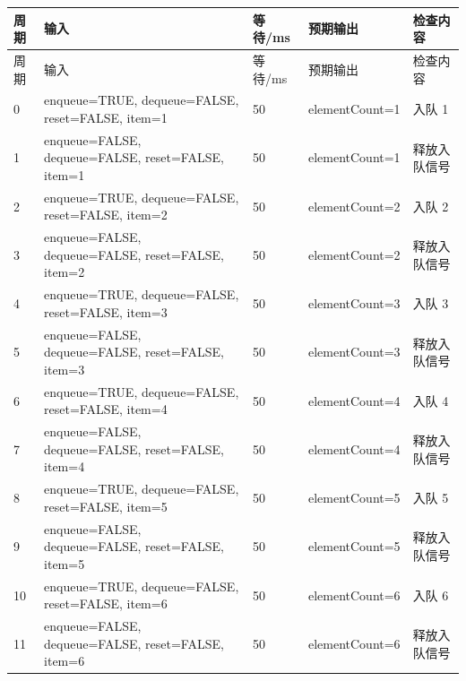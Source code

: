 \begin{longtable}{L{1.0cm}L{4.7cm}L{1.4cm}L{4.0cm}L{2.1cm}}

\toprule

周期 & 输入 & 等待/ms & 预期输出 & 检查内容\\

\midrule

\endfirsthead

\toprule

周期 & 输入 & 等待/ms & 预期输出 & 检查内容\\

\midrule

\endhead

0 & enqueue=TRUE, dequeue=FALSE, reset=FALSE, item=1 & 50 & elementCount=1 & 入队 1\\

1 & enqueue=FALSE, dequeue=FALSE, reset=FALSE, item=1 & 50 & elementCount=1 & 释放入队信号\\

2 & enqueue=TRUE, dequeue=FALSE, reset=FALSE, item=2 & 50 & elementCount=2 & 入队 2\\

3 & enqueue=FALSE, dequeue=FALSE, reset=FALSE, item=2 & 50 & elementCount=2 & 释放入队信号\\

4 & enqueue=TRUE, dequeue=FALSE, reset=FALSE, item=3 & 50 & elementCount=3 & 入队 3\\

5 & enqueue=FALSE, dequeue=FALSE, reset=FALSE, item=3 & 50 & elementCount=3 & 释放入队信号\\

6 & enqueue=TRUE, dequeue=FALSE, reset=FALSE, item=4 & 50 & elementCount=4 & 入队 4\\

7 & enqueue=FALSE, dequeue=FALSE, reset=FALSE, item=4 & 50 & elementCount=4 & 释放入队信号\\

8 & enqueue=TRUE, dequeue=FALSE, reset=FALSE, item=5 & 50 & elementCount=5 & 入队 5\\

9 & enqueue=FALSE, dequeue=FALSE, reset=FALSE, item=5 & 50 & elementCount=5 & 释放入队信号\\

10 & enqueue=TRUE, dequeue=FALSE, reset=FALSE, item=6 & 50 & elementCount=6 & 入队 6\\

11 & enqueue=FALSE, dequeue=FALSE, reset=FALSE, item=6 & 50 & elementCount=6 & 释放入队信号\\


\end{longtable}
